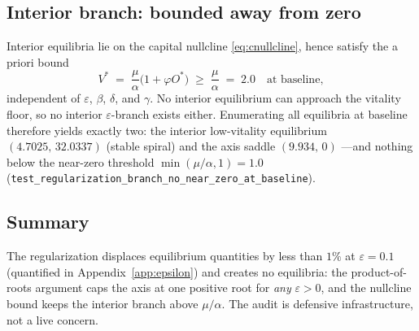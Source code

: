 \subsection{Interior branch: bounded away from zero}

Interior equilibria lie on the capital nullcline \eqref{eq:cnullcline},
hence satisfy the a priori bound
\[
V^{*} \;=\; \frac{\mu}{\alpha}\bigl(1+\varphi O^{*}\bigr)
\;\ge\;\frac{\mu}{\alpha} \;=\;2.0
\quad\text{at baseline},
\]
independent of $\varepsilon$, $\beta$, $\delta$, and $\gamma$. No interior
equilibrium can approach the vitality floor, so no interior
$\varepsilon$-branch exists either. Enumerating all equilibria at baseline
therefore yields exactly two: the interior low-vitality equilibrium
$(4.7025,\,32.0337)$ (stable spiral) and the axis saddle $(9.934,\,0)$
---and nothing below the near-zero threshold
$\min(\mu/\alpha,1)=1.0$
(\texttt{test\_regularization\_branch\_no\_near\_zero\_at\_baseline}).

\subsection{Summary}

The regularization displaces equilibrium quantities by less than $1\%$ at
$\varepsilon=0.1$ (quantified in Appendix~\ref{app:epsilon}) and creates no
equilibria: the product-of-roots argument caps the axis at one positive
root for \emph{any} $\varepsilon>0$, and the nullcline bound keeps the
interior branch above $\mu/\alpha$. The audit is defensive infrastructure,
not a live concern.
